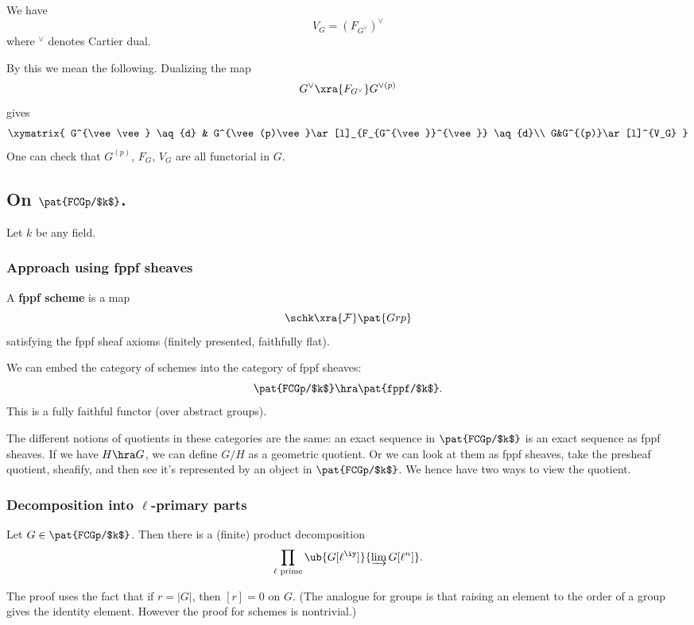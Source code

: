 \begin{pr}
We have
\[
V_G=(F_{G^{\vee}})^{\vee}
\]
where ${}^{\vee}$ denotes Cartier dual.
\end{pr}

By this we mean the following. Dualizing 
the map
\[
G^{\vee}\xra{F_{G^{\vee}}} G^{\vee(p)}
\]
gives 
\[
\xymatrix{
G^{\vee \vee} \aq{d} & G^{\vee(p)\vee}\ar[l]_{F_{G^{\vee}}^{\vee}} \aq{d}\\
G&G^{(p)}\ar[l]^{V_G}
}
\]
One can check that $G^{(p)}$, $F_G$, $V_G$ are all functorial in $G$.

\subsection{On $\pat{FCGp/$k$}$.}
Let $k$ be any field.
\subsubsection{Approach using fppf sheaves}
\begin{df}
A \textbf{fppf scheme} is a map 
\[
\schk\xra{\mathcal F} \pat{Grp}
\]
satisfying the fppf sheaf axioms (finitely presented, faithfully flat).
\end{df}
We can embed the category of schemes into the category of fppf sheaves:
\[
\pat{FCGp/$k$}\hra \pat{fppf/$k$}.
\]
This is a fully faithful functor (over abstract groups).

The different notions of quotients in these categories are the same: an exact sequence in $\pat{FCGp/$k$}$ is an exact sequence as fppf sheaves. If we have $H\hra G$, we can define $G/H$ as a geometric quotient. Or we can look at them as fppf sheaves, take the presheaf quotient, sheafify, and then see it's represented by an object in $\pat{FCGp/$k$}$. We hence have two ways to view the quotient.

\subsubsection{Decomposition into $\ell$-primary parts}
Let $G\in\pat{FCGp/$k$}$. Then there is a (finite) product decomposition
\[
\prod_{\ell\text{ prime}} \ub{G[\ell^{\iy}]}{\varinjlim G[\ell^n]}.
\]

The proof uses the fact that if $r=|G|$, then $[r]=0$ on $G$. (The analogue for groups is that raising an element to the order of a group gives the identity element. However the proof for schemes is nontrivial.)


